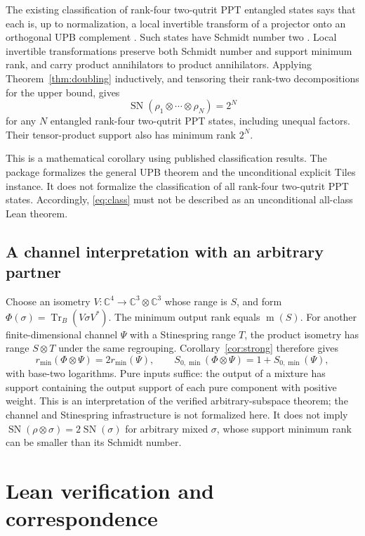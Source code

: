 \documentclass[11pt]{article}
\theoremstyle{definition}
\newcommand{\C}{\mathbb C}
\newcommand{\tr}{\operatorname{Tr}}
\newcommand{\SN}{\operatorname{SN}}
\newcommand{\minrank}{\operatorname{m}}
\begin{document}
The existing classification of rank-four two-qutrit PPT entangled states says
that each is, up to normalization, a local invertible transform of a projector
onto an orthogonal UPB complement \cite{skowronek2011,chendjokovic2011}.
Such states have Schmidt number two \cite{sanpera2001}. Local invertible
transformations preserve both Schmidt number and support minimum rank, and
carry product annihilators to product annihilators. Applying
Theorem~\ref{thm:doubling} inductively, and tensoring their rank-two
decompositions for the upper bound, gives
\begin{equation}\label{eq:class}
 \SN(\rho_1\otimes\cdots\otimes\rho_N)=2^N
\end{equation}
for any $N$ entangled rank-four two-qutrit PPT states, including unequal
factors. Their tensor-product support also has minimum rank $2^N$.

This is a mathematical corollary using published classification results.
The package formalizes the general UPB theorem and the unconditional explicit
Tiles instance. It does not formalize the classification of all rank-four
two-qutrit PPT states. Accordingly, \eqref{eq:class} must not be described as
an unconditional all-class Lean theorem.

\subsection{A channel interpretation with an arbitrary partner}

Choose an isometry $V:\C^4\to\C^3\otimes\C^3$ whose range is $S$, and form
$\Phi(\sigma)=\tr_B(V\sigma V^*)$. The minimum output rank equals
$\minrank(S)$. For another finite-dimensional channel $\Psi$ with a
Stinespring range $T$, the product isometry has range $S\otimes T$ under
the same regrouping. Corollary~\ref{cor:strong} therefore gives
\[
 r_{\min}(\Phi\otimes\Psi)=2r_{\min}(\Psi),\qquad
 S_{0,\min}(\Phi\otimes\Psi)=1+S_{0,\min}(\Psi),
\]
with base-two logarithms. Pure inputs suffice: the output of a mixture has
support containing the output support of each pure component with positive
weight. This is an interpretation of the verified arbitrary-subspace theorem;
the channel and Stinespring infrastructure is not formalized here. It does
not imply $\SN(\rho\otimes\sigma)=2\SN(\sigma)$ for arbitrary mixed
$\sigma$, whose support minimum rank can be smaller than its Schmidt number.

\section{Lean verification and correspondence}\label{sec:lean}
\end{document}
